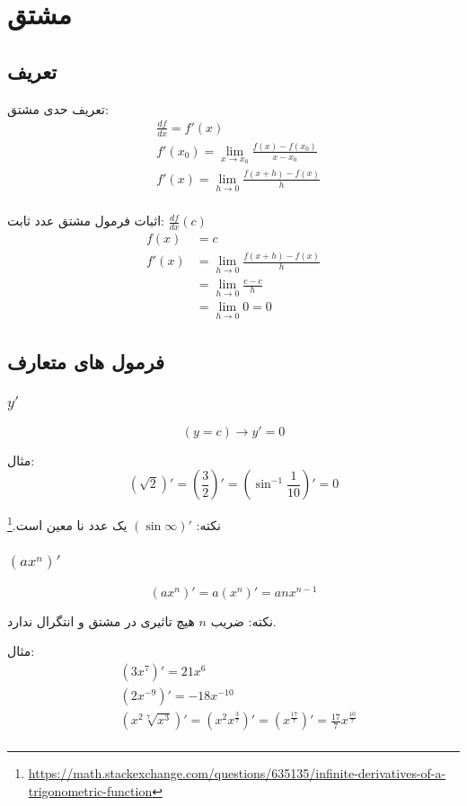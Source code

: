 \section{مشتق}
\subsection{تعریف}
تعریف حدی مشتق:
\begin{align*}
&\frac{df}{dx} = f'(x) \\
&f'(x_0) = \lim_{x\to x_0} \frac{f(x) - f(x_0)}{x-x_0} \\
&f'(x) = \lim_{h\to 0} \frac{f(x+h) - f(x)}{h} \\
\end{align*}

اثبات فرمول مشتق عدد ثابت: $\frac{df}{dx}(c)$
\begin{align*}
f(x) &= c \\
f'(x) &= \lim_{h\to 0}\frac{f(x+h) - f(x)}{h} \\
&= \lim_{h\to 0}\frac{c - c}{h} \\
&= \lim_{h\to 0} 0 = 0
\end{align*}

\subsection{فرمول های متعارف}
\subsubsection{$y'$}
\[ (y = c)\to y'= 0 \]

مثال:
\[ (\sqrt{2})' = (\frac{3}{2})' = (\sin^{-1}\frac{1}{10})' = 0 \]

نکته: $(\sin\infty)'$ یک عدد نا معین است.\footnote{\href{https://math.stackexchange.com/questions/635135/infinite-derivatives-of-a-trigonometric-function}{https://math.stackexchange.com/questions/635135/infinite-derivatives-of-a-trigonometric-function}}

\subsubsection{$(ax^n)'$}
\[ (ax^n)' = a(x^n)' = anx^{n-1} \]

نکته: ضریب $n$ هیچ تاثیری در مشتق و انتگرال ندارد.

مثال:
\begin{align*}
&(3x^7)' = 21x^6 \\
&(2x^{-9})' = -18x^{-10} \\
&(x^{2}\sqrt[7]{x^3})'=
	(x^2 x^{\frac{3}{7}})' =
	(x^{\frac{17}{7}})' =
	\frac{17}{7} x^{\frac{10}{7}} \\
\end{align*}

